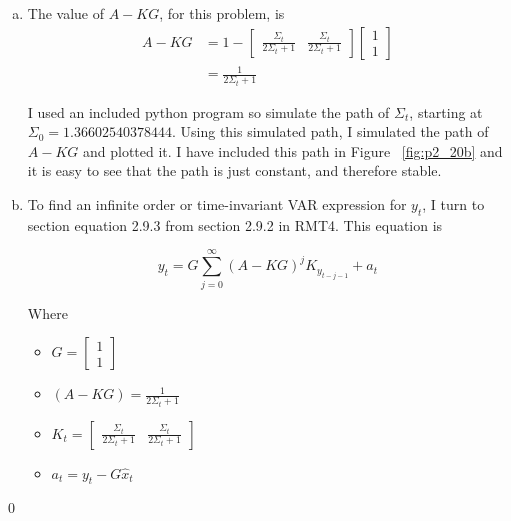 \documentclass{homework}
\newcommand{\sbmtwo}[2]{
   \ensuremath{ \left[\begin{smallmatrix} #1 \\ #2 \end{smallmatrix}\right]}
  }
\newcommand{\bmtwo}[2]{
   \ensuremath{ \begin{bmatrix} #1 \\ #2 \end{bmatrix}}
  }
\begin{document}
\begin{homeworkProblem}
{\begin{enumerate}[a.]
        Together these 4 equations specify the value of $\hat{x}_t$.
      \item The value of $A - KG$, for this problem, is
        \begin{align*}
          A - KG &= 1 - \begin{bmatrix} \frac{\Sigma_t }{2 \Sigma_t +1} & \frac{\Sigma_t }{2 \Sigma_t +1} \end{bmatrix} \bmtwo{1}{1} \\
           & = \frac{1}{2 \Sigma_t + 1}
        \end{align*}

        I used an included python program so simulate the path of $\Sigma_t$, starting at $\Sigma_0 = 1.36602540378444$. Using this simulated path, I simulated the path of $A - KG$ and plotted it. I have included this path in Figure ~\ref{fig:p2_20b} and it is easy to see that the path is just constant, and therefore stable.

      \item To find an infinite order or time-invariant VAR expression for $y_t$, I turn to section equation 2.9.3 from section 2.9.2 in RMT4. This equation is

        $$y_t = G \sum_{j=0}^{\infty} (A - KG)^j K_{y_{t - j - 1}} + a_t $$

        Where
        \begin{itemize}
          \item $G = \sbmtwo{1}{1}$
          \item $(A -KG) = \frac{1}{2 \Sigma_t + 1}$
          \item $K_t = \begin{bmatrix} \frac{\Sigma_t }{2 \Sigma_t +1} & \frac{\Sigma_t }{2 \Sigma_t +1} \end{bmatrix}$
          \item $a_t = y_t - G \hat{x}_t$
        \end{itemize}
    \end{enumerate}
    
    \qed

}
\end{homeworkProblem}
\end{document}

